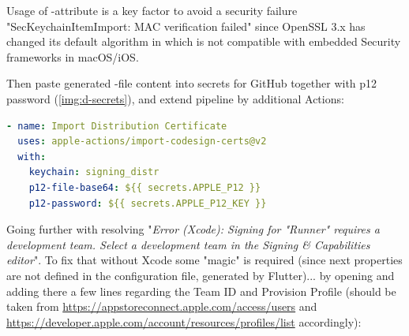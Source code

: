 \noindent Usage of -attribute is a key factor to avoid a security failure "SecKeychainItemImport: MAC
verification failed" since OpenSSL 3.x has changed its default algorithm in  which is not compatible with
embedded Security frameworks in macOS/iOS.

Then paste generated -file content into secrets for GitHub together with p12 password (\cref{img:d-secrets}),
and extend pipeline by additional Actions:

\begin{lstlisting}[language=yaml]
- name: Import Distribution Certificate
  uses: apple-actions/import-codesign-certs@v2
  with:
    keychain: signing_distr
    p12-file-base64: ${{ secrets.APPLE_P12 }}
    p12-password: ${{ secrets.APPLE_P12_KEY }}
\end{lstlisting}


\noindent Going further with resolving "\emph{Error (Xcode): Signing for "Runner" requires a development team. Select a
development team in the Signing \& Capabilities editor}". To fix that without Xcode some "magic" is required (since
next properties are not defined in the configuration file, generated by Flutter)... by opening
 and adding there a few lines regarding the Team ID and Provision Profile
(should be taken from \href{https://appstoreconnect.apple.com/access/users}{https://appstoreconnect.apple.com/access/users}
and \href{https://developer.apple.com/account/resources/profiles/list}{https://developer.apple.com/account/resources/profiles/list}
accordingly):\\
\\


